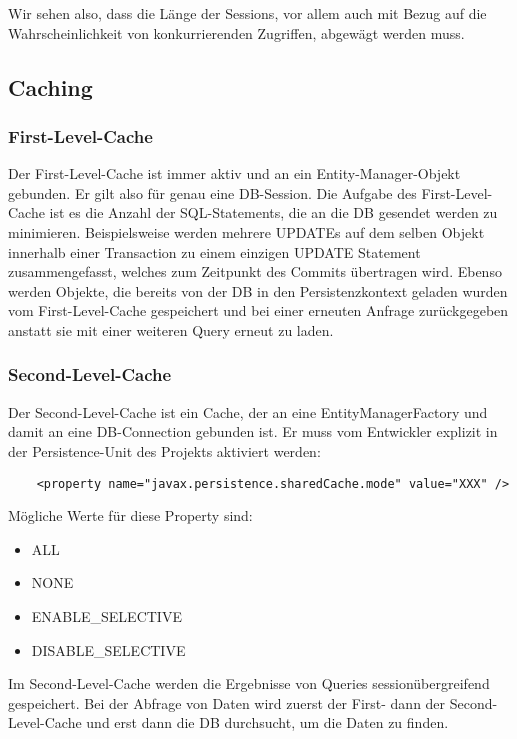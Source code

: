 Wir sehen also, dass die Länge der Sessions, vor allem auch mit Bezug auf die Wahrscheinlichkeit von konkurrierenden Zugriffen, abgewägt werden muss.

\subsection{Caching}

\subsubsection{First-Level-Cache}
Der First-Level-Cache ist immer aktiv und an ein Entity-Manager-Objekt gebunden. Er gilt also für genau eine DB-Session. Die Aufgabe des First-Level-Cache ist es die Anzahl der SQL-Statements, die an die DB gesendet werden zu minimieren. Beispielsweise werden mehrere UPDATEs auf dem selben Objekt innerhalb einer Transaction zu einem einzigen UPDATE Statement zusammengefasst, welches zum Zeitpunkt des Commits übertragen wird. Ebenso werden Objekte, die bereits von der DB in den Persistenzkontext geladen wurden vom First-Level-Cache gespeichert und bei einer erneuten Anfrage zurückgegeben anstatt sie mit einer weiteren Query erneut zu laden.

\subsubsection{Second-Level-Cache}
Der Second-Level-Cache ist ein Cache, der an eine EntityManagerFactory und damit an eine DB-Connection gebunden ist. Er muss vom Entwickler explizit in der Persistence-Unit des Projekts aktiviert werden:
\begin{lstlisting}
    <property name="javax.persistence.sharedCache.mode" value="XXX" />
\end{lstlisting}

Mögliche Werte für diese Property sind:
\begin{itemize}
    \item ALL
    \item NONE
    \item ENABLE\_SELECTIVE
    \item DISABLE\_SELECTIVE
\end{itemize}

Im Second-Level-Cache werden die Ergebnisse von Queries sessionübergreifend gespeichert. Bei der Abfrage von Daten wird zuerst der First- dann der Second-Level-Cache und erst dann die DB durchsucht, um die Daten zu finden.


